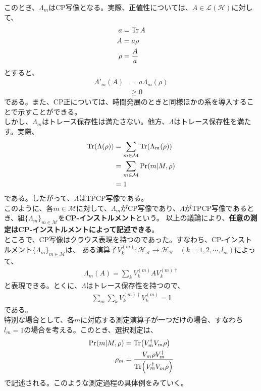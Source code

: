 \documentclass[a4paper,11pt]{jsarticle}
\numberwithin{equation}{section}
\begin{document}
このとき、$\Lambda_{m}$はCP写像となる。実際、正値性については、$A \in \mathcal{L}(\mathcal{H})$に対して、
\begin{align}
    a &= \Tr A\\
    A &= a\rho\\
    \rho &= \frac{A}{a}
\end{align}
とすると、
\begin{align}
    \Lambda'_m(A) &= a\Lambda_m(\rho)\\
    &\geq 0
\end{align}
である。また、CP正については、時間発展のときと同様ほかの系を導入することで示すことができる。\\
しかし、$\Lambda_m$はトレース保存性は満たさない。他方、$\Lambda$はトレース保存性を満たす。実際、
\begin{align}
    \Tr(\Lambda(\rho)) &= \sum_{m \in \mathcal{M}} \Tr(\Lambda_m(\rho))\\
    &= \sum_{m \in \mathcal{M}} \Pr(m|M,\rho)\\
    &= 1
\end{align}
である。したがって、$\Lambda$はTPCP写像である。\\
このように、各$m \in \mathcal{M}$に対して、$\Lambda_m$がCP写像であり、$\Lambda$がTPCP写像であるとき、組$\{\Lambda_m\}_{m \in \mathcal{M}}$を\textbf{CP-インストルメント}という。
以上の議論により、\textbf{任意の測定はCP-インストルメントによって記述できる}。\\
ところで、CP写像はクラウス表現を持つのであった。すなわち、CP-インストルメント$\{\Lambda_m\}_{m \in \mathcal{M}}$は、
ある演算子$V_{k}^{(m)} : \mathcal{H_A} \to \mathcal{H_B}\quad (k = 1,2,\cdots,l_m)$によって、
\begin{align}
    \Lambda_m(A) = \sum_{k}V_{k}^{(m)}AV_{k}^{(m)\dagger}
\end{align}
と表現できる。とくに、$\Lambda$はトレース保存性を持つので、
\begin{align}
    \sum_{m}\sum_{k}V_{k}^{(m)\dagger}V_{k}^{(m)} = \mathbb{I}
\end{align}
である。\\
特別な場合として、各$m$に対応する測定演算子が一つだけの場合、すなわち$l_m = 1$の場合を考える。このとき、選択測定は、
\begin{align}
    \Pr(m|M,\rho) &= \Tr(V_m^\dagger V_m \rho)\\
    \rho_m &= \frac{V_m\rho V_m^\dagger}{\Tr(V_m^\dagger V_m \rho)}
\end{align}
で記述される。このような測定過程の具体例をみていく。\\
\end{document}
